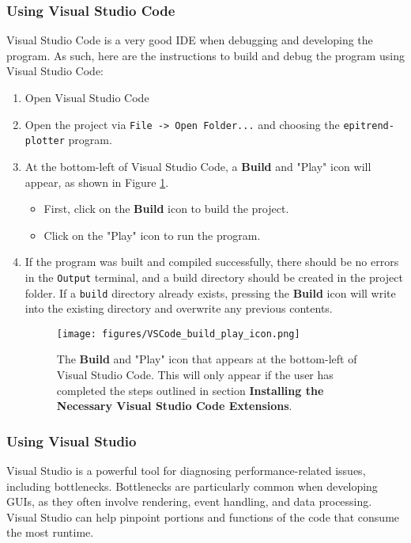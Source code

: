 \documentclass{article}
\begin{document}
\subsubsection{Using Visual Studio Code}
Visual Studio Code is a very good IDE when debugging and developing the program. As such, here are the instructions to build and debug the program using Visual Studio Code:
\begin{enumerate}
    \item Open Visual Studio Code

    \item Open the project via \texttt{File -> Open Folder...} and choosing the \texttt{epitrend-plotter} program.

    \item At the bottom-left of Visual Studio Code, a \textbf{Build} and "Play" icon will appear, as shown in Figure \ref{fig:VSCode_build_play_icon}. 
    \begin{itemize}
        \item First, click on the \textbf{Build} icon to build the project.
        \item Click on the "Play" icon to run the program.
    \end{itemize}

    \item If the program was built and compiled successfully, there should be no errors in the \texttt{Output} terminal, and a build directory should be created in the project folder. If a \texttt{build} directory already exists, pressing the \textbf{Build} icon will write into the existing directory and overwrite any previous contents.
    
    \begin{figure} [h]
        \centering
        \texttt{[image: figures/VSCode\_build\_play\_icon.png]}
        \caption{\label{fig:VSCode_build_play_icon} The \textbf{Build} and "Play" icon that appears at the bottom-left of Visual Studio Code. This will only appear if the user has completed the steps outlined in section \textbf{Installing the Necessary Visual Studio Code Extensions}.}
    \end{figure}
\end{enumerate}

\subsubsection{Using Visual Studio}
Visual Studio is a powerful tool for diagnosing performance-related issues, including bottlenecks. Bottlenecks are particularly common when developing GUIs, as they often involve rendering, event handling, and data processing. Visual Studio can help pinpoint portions and functions of the code that consume the most runtime.
\end{document}
